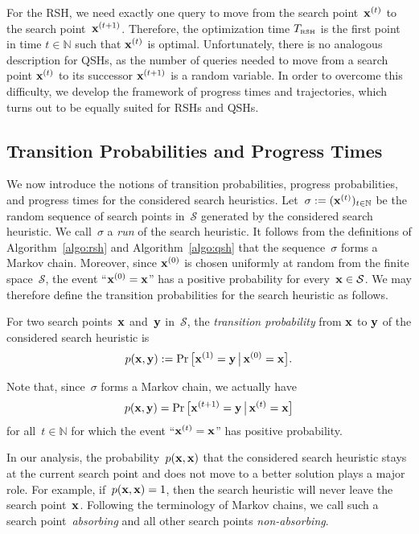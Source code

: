 \documentclass[a4paper,11pt]{article}
\begin{document}
For the RSH, we need exactly one query to move from the search point~$\xvec[t]$ to the search point~$\xvec[t+1]$. Therefore, the optimization time $T_{\text{\tiny\rm RSH}}$ is the first point in time $t\in\mathbb{N}$ such that $\xvec[t]$ is optimal. Unfortunately, there is no analogous description for QSHs, as the number of queries needed to move from a search point $\xvec[t]$ to its successor $\xvec[t+1]$ is a random variable. In order to overcome this difficulty, we develop the framework of progress times and trajectories, which turns out to be equally suited for RSHs and QSHs.

\subsection{Transition Probabilities and Progress Times}
\label{subsec:progress}
We now introduce the notions of transition probabilities, progress probabilities, and progress times for the considered search heuristics.  Let~$\sigma:=(\xvec[t])_{t\in\mathbb{N}}$ be the random sequence of search points in~$\mathcal{S}$ generated by the considered search heuristic. We call~$\sigma$ a \emph{run} of the search heuristic. It follows from the definitions of Algorithm~\ref{algo:rsh} and Algorithm~\ref{algo:qsh} that the sequence~$\sigma$ forms a Markov chain. Moreover, since $\xvec[0]$ is chosen uniformly at random from the finite space~$\mathcal{S}$, the event ``$\xvec[0]=\xvec$'' has a positive probability for every~$\xvec\in\mathcal{S}$. We may therefore define the transition probabilities for the search heuristic as follows.
\begin{definition}
\label{def:transition}
For two search points~$\xvec$ and~$\yvec$ in~$\mathcal{S}$, the \emph{transition probability} from $\xvec$ to $\yvec$ of the considered search heuristic is
\[
p(\xvec,\yvec):=\Pr\big[\xvec[1]=\yvec\bmid\xvec[0]=\xvec\big].
\]
\end{definition}
Note that, since~$\sigma$ forms a Markov chain, we actually have
\[
p(\xvec,\yvec)=\Pr\big[\xvec[t+1]=\yvec\bmid\xvec[t]=\xvec\big]
\]
for all~$t\in\mathbb{N}$ for which the event ``$\xvec[t]=\xvec$'' has positive probability. 

In our analysis, the probability~$p(\xvec,\xvec)$ that the considered search heuristic stays at the current search point and does not move to a better solution plays a major role. For example, if~$p(\xvec,\xvec)=1$, then the search heuristic will never leave the search point~$\xvec$. Following the terminology of Markov chains, we call such a search point~\emph{absorbing} and all other search points \emph{non-absorbing}. 
\end{document}
